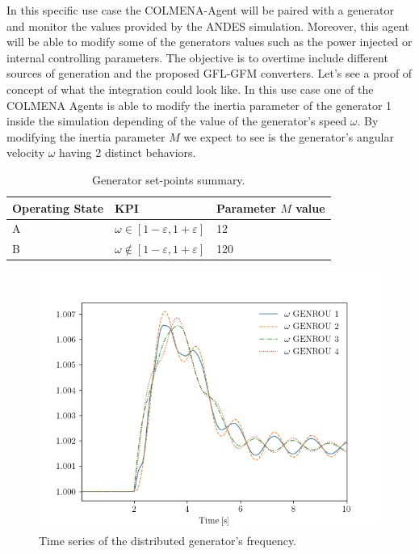 \documentclass{article}
\begin{document}
In this specific use case the COLMENA-Agent will be paired with a generator   and monitor the values provided by the ANDES simulation. Moreover, this agent will be able to modify some of the generators values such as the power injected or internal controlling parameters. The objective is to overtime include different sources of generation and the proposed GFL-GFM converters. Let's see a proof of concept of what the integration could look like. In this use case one of the COLMENA Agents is able to modify the inertia parameter of the generator 1 inside the simulation depending of the value of the generator's speed $\omega$. By modifying the inertia parameter $M$ we expect to see is the generator's angular velocity $\omega$ having 2 distinct behaviors.  

\begin{table}[H]
    \centering
    \begin{tabular}{|l|l|l|}
    \hline
    Operating State & KPI                              & Parameter $M$ value \\ \hline
    A               & $\omega \in [1 - \varepsilon, 1 + \varepsilon]$ & 12  \\ \hline
    B               & $\omega \notin [1 - \varepsilon, 1 + \varepsilon]$ & 120               \\ \hline
    \end{tabular}
    \caption{Generator set-points summary.}
\end{table}
  

\begin{figure}[h]  %
    \centering
    \includegraphics[width=1\textwidth]{pictures/plot.png}

    \caption{Time series of the distributed generator's frequency.}
    \label{fig:sample_figure2}
\end{figure}
\end{document}

